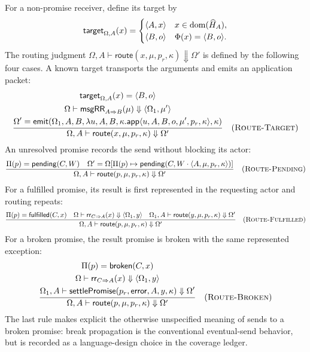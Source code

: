 For a non-promise receiver, define its target by
\begin{equation}\label{eq:eventual-target}
 \mathsf{target}_{\Omega,A}(x)=
 \begin{cases}
  \langle A,x\rangle & x\in\mathop{\mathrm{dom}}(\widehat H_A),\\
  \langle B,o\rangle & \Phi(x)=\langle B,o\rangle.
 \end{cases}
\end{equation}
The routing judgment
$\Omega,A\vdash\mathsf{route}(x,\mu,p_r,\kappa)\Downarrow\Omega'$ is
defined by the following four cases.  A known target transports the arguments
and emits an application packet:
{\small
\[
\dfrac{\begin{gathered}
 \mathsf{target}_{\Omega,A}(x)=\langle B,o\rangle\\
 \Omega\vdash\mathsf{msgRR}_{A\Rightarrow B}(\mu)
    \Downarrow\langle\Omega_1,\mu'\rangle\\
 \Omega'=\mathsf{emit}(\Omega_1,A,B,
    \lambda u,A,B,\kappa.\mathsf{app}\langle
       u,A,B,o,\mu',p_r,\kappa\rangle,\kappa)
\end{gathered}}
 {\Omega,A\vdash\mathsf{route}(x,\mu,p_r,\kappa)\Downarrow\Omega'}
\quad(\textsc{Route-Target})
\]}
An unresolved promise records the send without blocking its actor:
\[
\dfrac{\Pi(p)=\mathsf{pending}(C,W)\quad
       \Omega'=\Omega[\Pi(p)\mapsto
          \mathsf{pending}(C,W\cdot\langle A,\mu,p_r,\kappa\rangle)]}
 {\Omega,A\vdash\mathsf{route}(p,\mu,p_r,\kappa)\Downarrow\Omega'}
\quad(\textsc{Route-Pending})
\]
For a fulfilled promise, its result is first represented in the requesting
actor and routing repeats:
{\small\[
\dfrac{\Pi(p)=\mathsf{fulfilled}(C,x)\quad
       \Omega\vdash\mathsf{rr}_{C\Rightarrow A}(x)
          \Downarrow\langle\Omega_1,y\rangle\quad
       \Omega_1,A\vdash\mathsf{route}(y,\mu,p_r,\kappa)
          \Downarrow\Omega'}
 {\Omega,A\vdash\mathsf{route}(p,\mu,p_r,\kappa)\Downarrow\Omega'}
\quad(\textsc{Route-Fulfilled})
\]}
For a broken promise, the result promise is broken with the same represented
exception:
{\small\[
\dfrac{\begin{gathered}\Pi(p)=\mathsf{broken}(C,x)\\
       \Omega\vdash\mathsf{rr}_{C\Rightarrow A}(x)
          \Downarrow\langle\Omega_1,y\rangle\\
       \Omega_1,A\vdash\mathsf{settlePromise}(p_r,\mathsf{error},A,y,\kappa)
          \Downarrow\Omega'\end{gathered}}
 {\Omega,A\vdash\mathsf{route}(p,\mu,p_r,\kappa)\Downarrow\Omega'}
\quad(\textsc{Route-Broken})
\]}
The last rule makes explicit the otherwise unspecified meaning of sends to a
broken promise: break propagation is the conventional eventual-send behavior,
but is recorded as a language-design choice in the coverage ledger.

